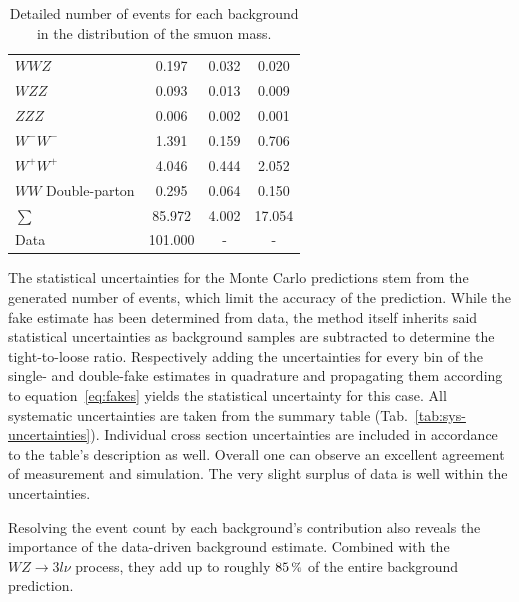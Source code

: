 \begin{table}[!htb]
\begin{tabular}{|l|c|c|c|}
    $WWZ$                           & 0.197                                & 0.032 & 0.020                       \\ 
    $WZZ$                           & 0.093                                & 0.013 & 0.009                       \\ 
    $ZZZ$                           & 0.006                                & 0.002 & 0.001                       \\ \hline
    $W^- W^-$                       & 1.391                                & 0.159 & 0.706                       \\ 
    $W^+ W^+$                       & 4.046                                & 0.444 & 2.052                       \\ 
    $WW$ Double-parton              & 0.295                                & 0.064 & 0.150                       \\ \hline
    $\sum$                          & 85.972                               & 4.002 & 17.054                      \\ \hline
    Data                            & 101.000                              & -     & -                           \\ \hline
  \end{tabular}
  \caption{Detailed number of events for each background in the distribution of the smuon mass.}
  \label{tab:nev-msmuon}
\end{table}

The statistical uncertainties for the Monte Carlo predictions stem from the generated number of events, which limit the accuracy of the prediction. While the fake estimate has been determined from data, the method itself inherits said statistical uncertainties as background samples are subtracted to determine the tight-to-loose ratio. Respectively adding the uncertainties for every bin of the single- and double-fake estimates in quadrature and propagating them according to equation~\eqref{eq:fakes} yields the statistical uncertainty for this case. All systematic uncertainties are taken from the summary table (Tab.~\ref{tab:sys-uncertainties}). Individual cross section uncertainties are included in accordance to the table's description as well. Overall one can observe an excellent agreement of measurement and simulation. The very slight surplus of data is well within the uncertainties.

Resolving the event count by each background's contribution also reveals the importance of the data-driven background estimate. Combined with the $WZ \rightarrow 3l\nu$ process, they add up to roughly $85\,\pct$ of the entire background prediction.


